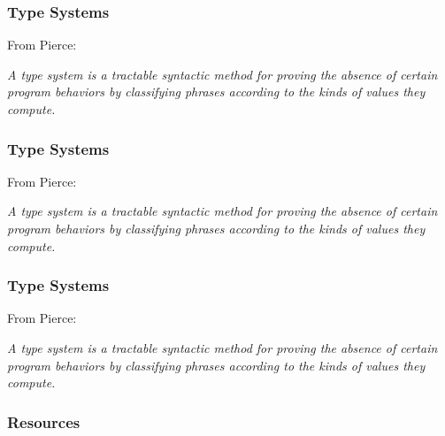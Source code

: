 \documentclass{beamer}
\begin{document}
\begin{frame}
\frametitle{Type Systems}

From Pierce:

\vspace{20pt}
\textit{A type system is a tractable syntactic method for proving the absence of
  certain program behaviors by classifying phrases according to the kinds of
  values they compute.}

\end{frame}

\begin{frame}
\frametitle{Type Systems}

From Pierce:

\vspace{20pt}
\textit{A type system is a tractable syntactic method for proving the absence of
  certain program behaviors by classifying phrases according to the kinds of
  values they compute.}

\end{frame}

\begin{frame}
\frametitle{Type Systems}

From Pierce:

\vspace{20pt}
\textit{A type system is a tractable syntactic method for proving the absence of
  certain program behaviors by classifying phrases according to the kinds of
  values they compute.}

\end{frame}

\begin{frame}
\frametitle{Resources}

\end{frame}
\end{document}
